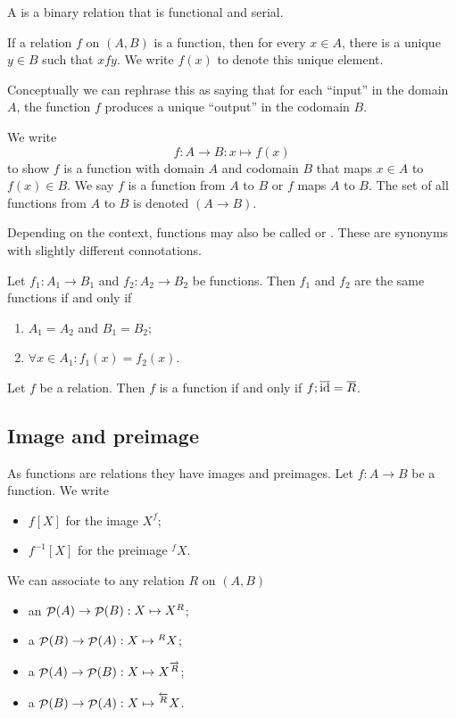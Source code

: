 \begin{definition}
A  is a binary relation that is functional and serial.
\end{definition}
If a relation $f$ on $(A, B)$ is a function, then for every $x\in A$, there is a unique $y\in B$ such that $xfy$. We write $f(x)$ to denote this unique element.

Conceptually we can rephrase this as saying that for each ``input'' in the domain $A$, the function $f$ produces a unique ``output'' in the codomain $B$.

\begin{note}
We write
\[f:A \to B: x\mapsto f(x) \]
to show $f$ is a function with domain $A$ and codomain $B$ that maps $x\in A$ to $f(x)\in B$. We say $f$ is a function from $A$ to $B$ or $f$ maps $A$ to $B$. The set of all functions from $A$ to $B$ is denoted $(A\to B)$.
\end{note}

Depending on the context, functions may also be called  or . These are synonyms with slightly different connotations.

\begin{lemma}
Let $f_1: A_1\to B_1$ and $f_2: A_2\to B_2$ be functions. Then $f_1$ and $f_2$ are the same functions \textup{if and only if}
\begin{enumerate}
\item $A_1 = A_2$ and $B_1 = B_2$;
\item $\forall x\in A_1: f_1(x) = f_2(x)$.
\end{enumerate}
\end{lemma}

\begin{lemma}
Let $f$ be a relation. Then $f$ is a function \textup{if and only if} $f;\overline{\operatorname{id}} = \overline{R}$.
\end{lemma}

\subsection{Image and preimage}
As functions are relations they have images and preimages. Let $f:A\to B$ be a function. We write
\begin{itemize}
\item $f[X]$ for the image $X^f$;
\item $f^{-1}[X]$ for the preimage $^fX$.
\end{itemize}

We can associate to any relation $R$ on $(A,B)$
\begin{itemize}
\item an  $\mathop{\mathcal{P}}(A) \to \mathop{\mathcal{P}}(B): X \mapsto X^R$;
\item a  $\mathop{\mathcal{P}}(B) \to \mathop{\mathcal{P}}(A): X \mapsto {^RX}$;
\item a  $\mathop{\mathcal{P}}(A) \to \mathop{\mathcal{P}}(B): X \mapsto X^{\overrightarrow{R}}$;
\item a  $\mathop{\mathcal{P}}(B) \to \mathop{\mathcal{P}}(A): X \mapsto {^{\overleftarrow{R}}X}$.
\end{itemize}

